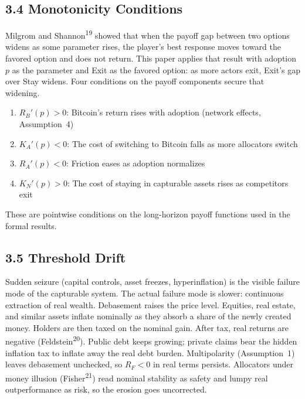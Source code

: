 \documentclass[12pt]{article}
\theoremstyle{definition}
\theoremstyle{remark}
\begin{document}
\subsection{3.4 Monotonicity Conditions}

Milgrom and Shannon\textsuperscript{19} showed that when the payoff
gap between two options widens as some parameter rises, the player's
best response moves toward the favored option and does not return.
This paper applies that result with adoption $p$ as the parameter
and Exit as the favored option: as more actors exit, Exit's gap
over Stay widens. Four conditions on the payoff components secure
that widening.

\begin{enumerate}[label=(M\arabic*),nosep]
\item $R_B'(p) > 0$: Bitcoin's return rises with adoption (network effects, Assumption~4)
\item $K_A'(p) < 0$: The cost of switching to Bitcoin falls as more allocators switch
\item $R_A'(p) < 0$: Friction eases as adoption normalizes
\item $K_N'(p) > 0$: The cost of staying in capturable assets rises as competitors exit
\end{enumerate}

\smallskip
\noindent These are pointwise conditions on the long-horizon payoff functions used in the formal results.

\subsection{3.5 Threshold Drift}

Sudden seizure (capital controls, asset freezes, hyperinflation) is the visible failure mode of the capturable system. The actual failure mode is slower: continuous extraction of real wealth. Debasement raises the price level. Equities, real estate, and similar assets inflate nominally as they absorb a share of the newly created money. Holders are then taxed on the nominal gain. After tax, real returns are negative (Feldstein\textsuperscript{20}). Public debt keeps growing; private claims bear the hidden inflation tax to inflate away the real debt burden. Multipolarity (Assumption~1) leaves debasement unchecked, so $R_F < 0$ in real terms persists. Allocators under money illusion (Fisher\textsuperscript{21}) read nominal stability as safety and lumpy real outperformance as risk, so the erosion goes uncorrected.
\end{document}
